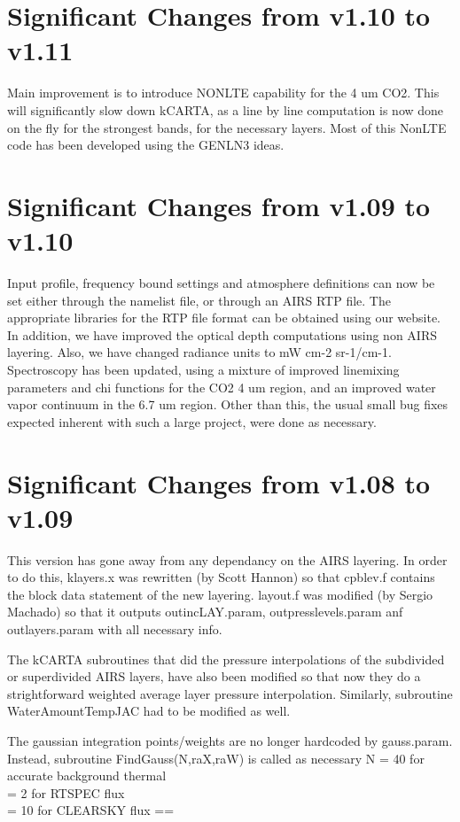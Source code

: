 \documentclass[12pt]{article}
\begin{document}
{{{{\section{Significant Changes from v1.10 to v1.11}
Main improvement is to introduce NONLTE capability for the 4 um CO2. This will
significantly slow down kCARTA, as a line by line computation is now done on
the fly for the strongest bands, for the necessary layers. Most of this 
NonLTE code has been developed using the GENLN3 ideas.

\section{Significant Changes from v1.09 to v1.10}
Input profile, frequency bound settings and atmosphere definitions can now be
set either through the namelist file, or through an AIRS RTP file. The 
appropriate libraries for the RTP file format can be obtained using our 
website. In addition, we have improved the optical depth computations using
non AIRS layering. Also, we have changed radiance units to mW cm-2 sr-1/cm-1.
Spectroscopy has been updated, using a mixture of improved linemixing 
parameters and chi functions for the CO2 4 um region, and an improved water
vapor continuum in the 6.7 um region. Other than this, the usual small bug 
fixes expected inherent with such a large project, were done as necessary.

\section{Significant Changes from v1.08 to v1.09}
This version has gone away from any dependancy on the AIRS layering. In order 
to do this, klayers.x was rewritten (by Scott Hannon) so that cpblev.f 
contains the block data statement of the new layering. layout.f was modified 
(by Sergio Machado) so that it outputs outincLAY.param, outpresslevels.param 
anf outlayers.param with all necessary info. 
 
The kCARTA subroutines that did the pressure interpolations of the subdivided 
or superdivided AIRS layers, have also been modified so that now they do a  
strightforward weighted average layer pressure interpolation. 
 Similarly, subroutine WaterAmountTempJAC had to be modified as well. 
 
The gaussian integration points/weights are no longer hardcoded by 
gauss.param. Instead, subroutine FindGauss(N,raX,raW) is called as necessary 
N = 40  for accurate background thermal  \\
  = 2   for RTSPEC flux \\
  = 10  for CLEARSKY flux ==
 
}}}}
\end{document}
